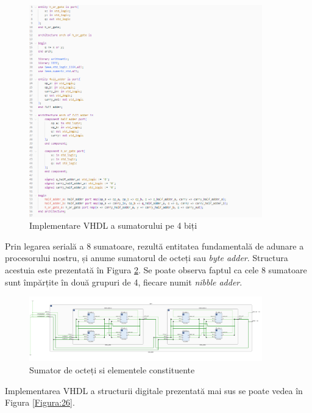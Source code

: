 \documentclass[12pt]{article}
\begin{document}
 \begin{figure}[h!]
 \includegraphics[width=0.9\textwidth]{fulladder.png}
 \centering
 \caption{Implementare VHDL a sumatorului pe 4 biți}
 \label{Figura:25}
 \end{figure}

Prin legarea serială a 8 sumatoare, rezultă entitatea fundamentală de adunare a procesorului nostru, și anume sumatorul de octeți sau \textit{byte adder}. Structura acestuia este prezentată în Figura \ref{Figura:17}. Se poate observa faptul ca cele 8 sumatoare sunt împărțite în două grupuri de 4, fiecare numit \textit{nibble adder}.
 \begin{figure}[h!]
 \includegraphics[width=0.9\textwidth]{byteadder.png}
 \centering
 \caption{Sumator de octeți si elementele constituente}
 \label{Figura:17}
 \end{figure}

Implementarea VHDL a structurii digitale prezentată mai sus se poate vedea în Figura \ref{Figura:26}.
\end{document}
